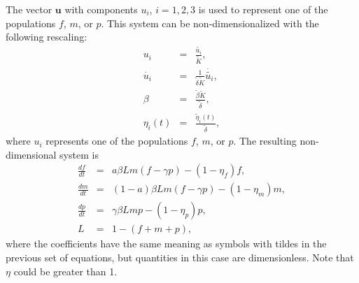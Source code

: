 	The vector $\textbf{u}$ with components $u_i$, $i=1,2,3$ is used to represent one of the populations $f$, $m$, or $p$. This system can be non-dimensionalized with the following rescaling:
	\begin{eqnarray*}
		{u_i} & = & \frac{\tilde{u_i}}{\tilde{K}},\\
		\dot{u_i} & = & \frac{1}{\tilde{\delta} \tilde{K}}\dot{\tilde{u_i}} ,\\
		{\beta} & = & \frac{\tilde{\beta}  \tilde{K}}{\tilde{\delta}},\\
		\eta_i(t) & = & \frac{\tilde{\eta}_i(t)}{\tilde{\delta}},
	\end{eqnarray*}
	where ${u_i}$ represents one of the populations $f$, $m$, or $p$. The resulting non-dimensional system is
	\begin{eqnarray*}
		\frac{df}{dt} & = & a \beta{L}{m}(f-\gamma p)-(1-\eta_f) f \label{eq:PoeciliaF}, \\
		\frac{dm}{dt} & = & (1-a) \beta{L}{m}(f-\gamma p)-(1- \eta_m) m \label{eq:PoeciliaM}, \\
		\frac{dp}{dt} & = & \gamma\beta{L}m p -(1-\eta_p) p \label{eq:PoeciliaP},\\ 
		L & = &  1-(f+m+p)\label{eq:PoecilaL}, 
	\end{eqnarray*}
	where the coefficients have the same meaning as symbols with tildes in the previous set of equations, but quantities in this case are dimensionless. Note that $\eta$ could be greater than 1.

